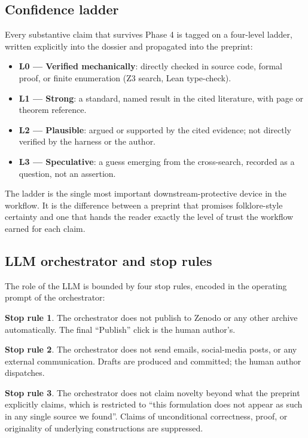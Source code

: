 \documentclass[11pt]{article}
\theoremstyle{definition}
\newtheorem*{stop-rule}{Stop rule}
\theoremstyle{remark}
\begin{document}
\subsection{Confidence ladder}\label{sec:ladder}

Every substantive claim that survives Phase 4 is tagged on a four-level
ladder, written explicitly into the dossier and propagated into the
preprint:

\begin{itemize}
\item \textbf{L0 --- Verified mechanically}: directly checked in source
code, formal proof, or finite enumeration (Z3 search, Lean type-check).
\item \textbf{L1 --- Strong}: a standard, named result in the cited
literature, with page or theorem reference.
\item \textbf{L2 --- Plausible}: argued or supported by the cited
evidence; not directly verified by the harness or the author.
\item \textbf{L3 --- Speculative}: a guess emerging from the
cross-search, recorded as a question, not an assertion.
\end{itemize}

The ladder is the single most important downstream-protective device in
the workflow. It is the difference between a preprint that promises
folklore-style certainty and one that hands the reader exactly the level
of trust the workflow earned for each claim.

\subsection{LLM orchestrator and stop rules}\label{sec:stop-rules}

The role of the LLM is bounded by four stop rules, encoded in the
operating prompt of the orchestrator:

\begin{stop-rule}
The orchestrator does not publish to Zenodo or any other archive
automatically. The final ``Publish'' click is the human author's.
\end{stop-rule}

\begin{stop-rule}
The orchestrator does not send emails, social-media posts, or any
external communication. Drafts are produced and committed; the human
author dispatches.
\end{stop-rule}

\begin{stop-rule}
The orchestrator does not claim novelty beyond what the preprint
explicitly claims, which is restricted to ``this formulation does not
appear as such in any single source we found''. Claims of unconditional
correctness, proof, or originality of underlying constructions are
suppressed.
\end{stop-rule}
\end{document}
